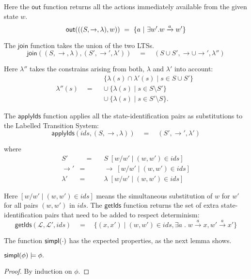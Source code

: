\NI Here the $\mathsf{out}$ function returns all the actions
immediately available from the given state $w$.
\[
  \mathsf{out}(((S,\rightarrow,\lambda),w)) 
     \ =\  \{ a \ | \  \exists w' . w \xrightarrow{a} w'\} 
\]

\NI The $\mathsf{join}$ function takes the union of the two LTSs.
\[
   \mathsf{join}((S, \rightarrow,\lambda), (S', \rightarrow', \lambda')) 
      \quad=\quad
   (S \cup S', \rightarrow \cup \rightarrow', \lambda'')
\]

\NI Here $\lambda''$ takes the constrains arising from both, $\lambda$ and
$\lambda'$ into account: 
\[
   \lambda''(s) 
      \quad = \quad
   \begin{array}{l}
      \{\lambda(s) \cap \lambda'(s) \; | \; s \in S \cup S'\} \\ \cup \ 
      \{\lambda(s)\; |\; s\in S \setminus S' \} \\ \cup \ 
      \{\lambda(s)\; |\; s\in S' \setminus S \}. 
   \end{array}
\]

\NI The $\mathsf{applyIds}$ function applies all the
state-identification pairs as substitutions to the Labelled Transition
System:
\[
   \mathsf{applyIds}(ids, (S, \rightarrow, \lambda)) 
      \quad=\quad 
   (S', \rightarrow', \lambda')
\]

\NI where
\begin{eqnarray*}
  S' &\quad =\quad & S \; [ w / w' \; | \; (w,w') \in ids] \\
  \rightarrow' & = & \rightarrow \; [ w / w' \; | \; (w,w') \in ids] \\
  \lambda' & = & \lambda \; [ w / w' \; | \; (w,w') \in ids]
\end{eqnarray*}

\NI Here $[ w / w' \; | \; (w,w') \in ids]$ means the simultaneous
substitution of $w$ for $w'$ for all pairs $(w, w')$ in $ids$.  The
$\mathsf{getIds}$ function returns the set of extra
state-identification pairs that need to be added to respect
determinism:
\[
   \mathsf{getIds}(\mathcal{L}, \mathcal{L}', ids) 
      \quad=\quad 
   \{(x,x') \; | \; (w,w') \in ids, \exists a \; . \; w \xrightarrow{a} x, w' \xrightarrow{a} x'\}
\]

\NI The function $\mathsf{simpl}(\cdot)$ has the expected properties, as the next
lemma shows.  

\begin{lemma}
$\mathsf{simpl}(\phi) \models \phi.$
\end{lemma}
\begin{proof}
By induction on $\phi$.
\end{proof}

